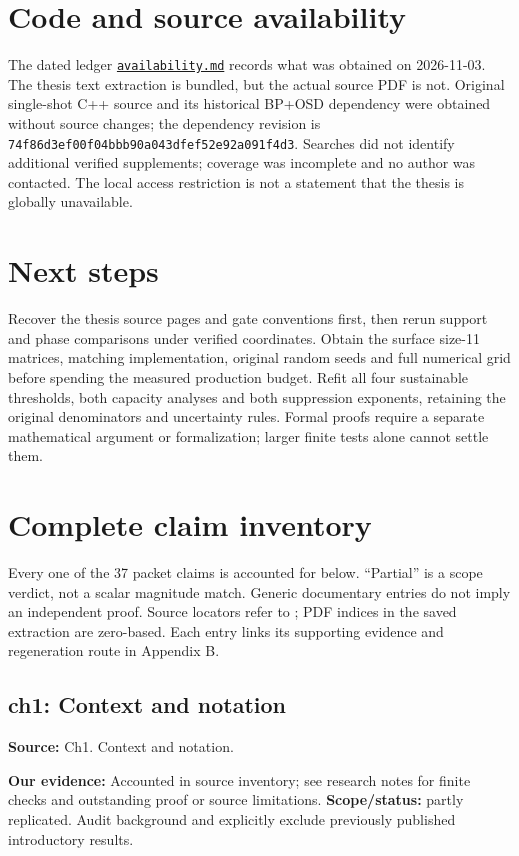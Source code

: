 \documentclass[11pt]{article}
\begin{document}
\section{Code and source availability}
The dated ledger \href{https://github.com/alectionary/vibe-math/blob/master/formalization/quintavalle-hgp/availability.md}{\nolinkurl{availability.md}} records what was obtained on 2026-11-03. The thesis text extraction is bundled, but the actual source PDF is not. Original single-shot C++ source and its historical BP+OSD dependency were obtained without source changes; the dependency revision is \texttt{74f86d3ef00f04bbb90a043dfef52e92a091f4d3}. Searches did not identify additional verified supplements; coverage was incomplete and no author was contacted. The local access restriction is not a statement that the thesis is globally unavailable.

\section{Next steps}
Recover the thesis source pages and gate conventions first, then rerun support and phase comparisons under verified coordinates. Obtain the surface size-11 matrices, matching implementation, original random seeds and full numerical grid before spending the measured production budget. Refit all four sustainable thresholds, both capacity analyses and both suppression exponents, retaining the original denominators and uncertainty rules. Formal proofs require a separate mathematical argument or formalization; larger finite tests alone cannot settle them.

\appendix
\section{Complete claim inventory}
Every one of the 37 packet claims is accounted for below. ``Partial'' is a scope verdict, not a scalar magnitude match. Generic documentary entries do not imply an independent proof. Source locators refer to \citet{quintavalle2022}; PDF indices in the saved extraction are zero-based. Each entry links its supporting evidence and regeneration route in Appendix B.
\subsection{ch1: Context and notation}
\label{claim:ch1}
\textbf{Source:} Ch1. Context and notation.

\textbf{Our evidence:} Accounted in source inventory; see research notes for finite checks and outstanding proof or source limitations. \textbf{Scope/status:} partly replicated. Audit background and explicitly exclude previously published introductory results.
\end{document}
